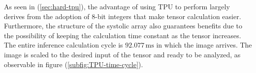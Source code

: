 As seen in (\ref{sec:hard-tpu}), the advantage of using TPU to perform largely derives
from the adoption of 8-bit integers that make tensor calculation easier.\\
Furthermore, the structure of the systolic array also guarantees benefits due to
the possibility of keeping the calculation time constant as the tensor
increases.
The entire inference calculation cycle is $92.077 \, \si{\milli\second}$ in
which the image arrives. The image is scaled to the desired input of the tensor
and ready to be analyzed, as observable in figure (\ref{subfig:TPU-time-cycle}).
